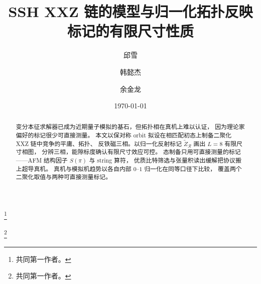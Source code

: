 \documentclass[aps,pra,reprint,groupedaddress,floatfix]{revtex4-2}
\begin{document}
\title{SSH XXZ 链的模型与归一化拓扑反映标记的有限尺寸性质}

\author{邱雪}\thanks{共同第一作者。}
\author{韩懿杰}\thanks{共同第一作者。}
\author{余金龙}

\date{\today}

\begin{abstract}
变分本征求解器已成为近期量子模拟的基石，但拓扑相在真机上难以认证，
因为理论家偏好的标记很少可直接测量。
本文以保对称 orbit 拟设在相匹配初态上制备二聚化 XXZ 链中竞争的平庸、拓扑、
反铁磁三相。以归一化反射标记 $\tilde{Z}_{\mathcal R}$ 画出 $L=8$ 有限尺寸相图，
分辨三相，能隙标度确认有限尺寸效应可控。
态制备只用可直接测量的标记——AFM 结构因子 $S(\pi)$ 与 string 算符，
优质比特筛选与张量积读出缓解把协议搬上超导真机。
真机与模拟机趋势以各自内部 $0$--$1$ 归一化在同等口径下比较，
覆盖两个二聚化取值与两种可直接测量标记。
\end{abstract}

\maketitle


\FloatBarrier

\FloatBarrier

\FloatBarrier

\FloatBarrier

\FloatBarrier

\FloatBarrier

\FloatBarrier

\FloatBarrier

\FloatBarrier

\FloatBarrier


\FloatBarrier

\end{document}
